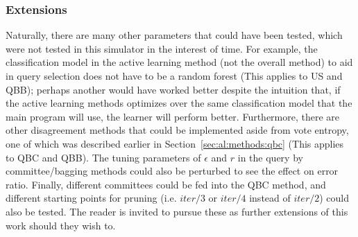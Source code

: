 \subsubsection{Extensions}

Naturally, there are many other parameters that could have been tested, which 
were not tested in this simulator in the interest of time. For 
example, the classification model in the active learning method (not the 
overall method) to aid in query selection does not have to be a random forest 
(This applies to US and QBB); perhaps another would have worked better despite 
the intuition that, if the active learning methods optimizes over the same 
classification model that the main program will use, the learner will perform 
better. Furthermore, there are other disagreement methods 
that could be implemented aside from vote entropy, one of which was described 
earlier in Section~\ref{sec:al:methods:qbc} (This applies to QBC and QBB). The 
tuning parameters of $\epsilon$ and $r$ in the query by committee/bagging 
methods could also be perturbed to see the effect on error ratio. Finally, 
different committees could be fed into the QBC method, and different starting 
points for pruning (i.e. $iter/3$ or $iter/4$ instead of $iter/2$) could also 
be tested. The reader is invited to pursue these as further extensions of this 
work should they wish to.